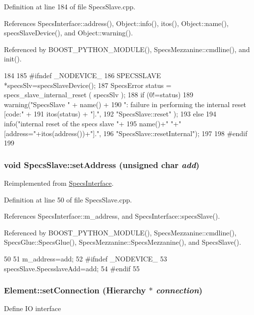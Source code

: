 Definition at line 184 of file SpecsSlave.cpp.

References SpecsInterface::address(), Object::info(), itos(), Object::name(), specsSlaveDevice(), and Object::warning().

Referenced by BOOST\_\-PYTHON\_\-MODULE(), SpecsMezzanine::cmdline(), and init().


\begin{DoxyCode}
184                               {
185 #ifndef _NODEVICE_
186   SPECSSLAVE *specsSlv=specsSlaveDevice();
187   SpecsError status = specs_slave_internal_reset ( specsSlv );
188   if (0!=status){
189     warning("SpecsSlave " + name() +
190             ": failure in performing the internal reset [code:" +
191             itos(status) + "].",
192             "SpecsSlave::reset" );   }
193   else{
194     info("internal reset of the specs slave "+
195          name()+" "+" [address="+itos(address())+"].",
196          "SpecsSlave::resetInternal");
197   }
198 #endif
199 }
\end{DoxyCode}
\hypertarget{classSpecsSlave_a1e5917c1f323cd7b4aabe4940c6baf12}{
\subsubsection[{setAddress}]{\setlength{\rightskip}{0pt plus 5cm}void SpecsSlave::setAddress (unsigned char {\em add})}}
\label{classSpecsSlave_a1e5917c1f323cd7b4aabe4940c6baf12}


Reimplemented from \hyperlink{classSpecsInterface_aa92dff67cc80487ee3109b6aee2fa007}{SpecsInterface}.

Definition at line 50 of file SpecsSlave.cpp.

References SpecsInterface::m\_\-address, and SpecsInterface::specsSlave().

Referenced by BOOST\_\-PYTHON\_\-MODULE(), SpecsMezzanine::cmdline(), SpecsGlue::SpecsGlue(), SpecsMezzanine::SpecsMezzanine(), and SpecsSlave().


\begin{DoxyCode}
50                                             {
51   m_address=add;
52 #ifndef _NODEVICE_
53   specsSlave.SpecsslaveAdd=add;
54 #endif
55 }
\end{DoxyCode}
\hypertarget{classElement_ab476b4b1df5954141ceb14f072433b89}{
\subsubsection[{setConnection}]{ Element::setConnection ({\bf Hierarchy} $\ast$ {\em connection})}}
\label{classElement_ab476b4b1df5954141ceb14f072433b89}
Define IO interface 

